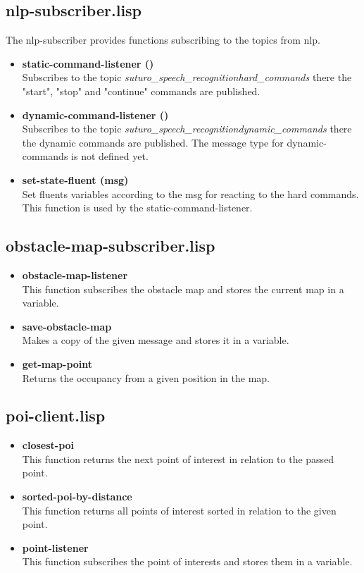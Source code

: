 \documentclass[main.tex]{subfiles}
\begin{document}
		\subsection{nlp-subscriber.lisp}
		The nlp-subscriber provides functions subscribing to the topics from nlp.
		\begin{itemize}
		   \item \textbf{static-command-listener ()} \\
		   Subscribes to the topic \textit{suturo\_speech\_recognition\/hard\_commands} there the "start", "stop" and "continue" commands are published.
		   \item \textbf{dynamic-command-listener ()} \\
		   Subscribes to the topic \textit{suturo\_speech\_recognition\/dynamic\_commands} there the dynamic commands are published. The message type for dynamic-commands is not defined yet.
		   \item \textbf{set-state-fluent (msg)} \\
		   Set fluents variables according to the msg for reacting to the hard commands. This function is used by the static-command-listener.
		 \end{itemize}
		\subsection{obstacle-map-subscriber.lisp}
	    \begin{itemize}
	    	\item \textbf{obstacle-map-listener} \\
	    	This function subscribes the obstacle map and stores the current map in a variable.
	    	\item \textbf{save-obstacle-map} \\
	    	Makes a copy of the given message and stores it in a variable.
	    	\item \textbf{get-map-point} \\
	    	Returns the occupancy from a given position in the map.
	    \end{itemize}
		\subsection{poi-client.lisp}
 		\begin{itemize}
	    	\item \textbf{closest-poi} \\
	    	This function returns the next point of interest in relation to the passed point.
	    	\item \textbf{sorted-poi-by-distance} \\
	    	This function returns all points of interest sorted in relation to the given point.
	    	\item \textbf{point-listener} \\
	    	This function subscribes the point of interests and stores them in a variable.
	    \end{itemize}
\end{document}
